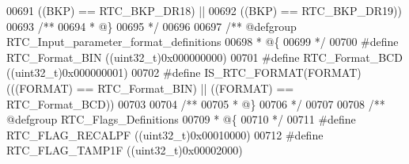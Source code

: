 \begin{DoxyCode}
00691                                            \textcolor{preprocessor}{(}\textcolor{preprocessor}{(}\textcolor{preprocessor}{BKP}\textcolor{preprocessor}{)} \textcolor{preprocessor}{==} RTC_BKP_DR18\textcolor{preprocessor}{)} \textcolor{preprocessor}{||}
00692                                            \textcolor{preprocessor}{(}\textcolor{preprocessor}{(}\textcolor{preprocessor}{BKP}\textcolor{preprocessor}{)} \textcolor{preprocessor}{==} RTC_BKP_DR19\textcolor{preprocessor}{)}\textcolor{preprocessor}{)}
00693 \textcolor{comment}{/**}
00694 \textcolor{comment}{  * @\}}
00695 \textcolor{comment}{  */}
00696 
00697 \textcolor{comment}{/** @defgroup RTC\_Input\_parameter\_format\_definitions }
00698 \textcolor{comment}{  * @\{}
00699 \textcolor{comment}{  */}
00700 \textcolor{preprocessor}{#}\textcolor{preprocessor}{define} \textcolor{preprocessor}{RTC\_Format\_BIN}                    \textcolor{preprocessor}{(}\textcolor{preprocessor}{(}\textcolor{preprocessor}{uint32\_t}\textcolor{preprocessor}{)}0x000000000\textcolor{preprocessor}{)}
00701 \textcolor{preprocessor}{#}\textcolor{preprocessor}{define} \textcolor{preprocessor}{RTC\_Format\_BCD}                    \textcolor{preprocessor}{(}\textcolor{preprocessor}{(}\textcolor{preprocessor}{uint32\_t}\textcolor{preprocessor}{)}0x000000001\textcolor{preprocessor}{)}
00702 \textcolor{preprocessor}{#}\textcolor{preprocessor}{define} \textcolor{preprocessor}{IS\_RTC\_FORMAT}\textcolor{preprocessor}{(}\textcolor{preprocessor}{FORMAT}\textcolor{preprocessor}{)} \textcolor{preprocessor}{(}\textcolor{preprocessor}{(}\textcolor{preprocessor}{(}\textcolor{preprocessor}{FORMAT}\textcolor{preprocessor}{)} \textcolor{preprocessor}{==} RTC_Format_BIN\textcolor{preprocessor}{)} \textcolor{preprocessor}{||} \textcolor{preprocessor}{(}\textcolor{preprocessor}{(}\textcolor{preprocessor}{FORMAT}\textcolor{preprocessor}{)} \textcolor{preprocessor}{==} 
      RTC_Format_BCD\textcolor{preprocessor}{)}\textcolor{preprocessor}{)}
00703 
00704 \textcolor{comment}{/**}
00705 \textcolor{comment}{  * @\}}
00706 \textcolor{comment}{  */}
00707 
00708 \textcolor{comment}{/** @defgroup RTC\_Flags\_Definitions }
00709 \textcolor{comment}{  * @\{}
00710 \textcolor{comment}{  */}
00711 \textcolor{preprocessor}{#}\textcolor{preprocessor}{define} \textcolor{preprocessor}{RTC\_FLAG\_RECALPF}                  \textcolor{preprocessor}{(}\textcolor{preprocessor}{(}\textcolor{preprocessor}{uint32\_t}\textcolor{preprocessor}{)}0x00010000\textcolor{preprocessor}{)}
00712 \textcolor{preprocessor}{#}\textcolor{preprocessor}{define} \textcolor{preprocessor}{RTC\_FLAG\_TAMP1F}                   \textcolor{preprocessor}{(}\textcolor{preprocessor}{(}\textcolor{preprocessor}{uint32\_t}\textcolor{preprocessor}{)}0x00002000\textcolor{preprocessor}{)}

\end{DoxyCode}
